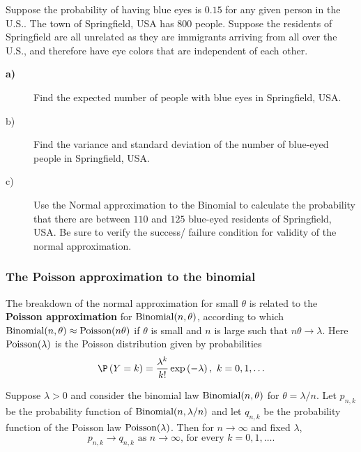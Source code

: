 \begin{Exercise}[label={ExBlueEyedInSpringfield}]
Suppose the probability of having blue eyes is $0.15$
for any given person in the U.S.. The town of Springfield, USA has $800$
people. Suppose the residents of Springfield are all unrelated as they are immigrants arriving from all over the U.S., 
and therefore have eye colors that are independent of each other.

\begin{description}
\item[\textbf{a)}] Find the expected number of people with blue eyes in
Springfield, USA.

\item[b)] Find the variance and standard deviation of the number of
blue-eyed people in Springfield, USA.

\item[c)] Use the Normal approximation to the Binomial to calculate the
probability that there are between $110$ and $125$ blue-eyed residents of
Springfield, USA. Be sure to verify the success/ failure condition for
validity of the normal approximation.
\end{description}
\end{Exercise}

\subsubsection{The Poisson approximation to the binomial}\label{S:PoissonApproxBinomialSuccessFailureRule}

The breakdown of the normal approximation for small $\theta$ is related to the 
\textbf{Poisson approximation} for $\mbox{{\rm Binomial}}(n,\theta)$, according to which $%
\binomial(n,\theta)\approx \poisson(n\theta)$ if $\theta$ is small and $n$ is large such that $%
n\theta\rightarrow \lambda $. Here $\mbox{{\rm Poisson}}(\lambda )$ is the Poisson
distribution given by probabilities 
\begin{equation*}
\P \left( Y=k\right) =\frac{\lambda ^{k}}{k!}\exp \left( -\lambda \right) ,%
\text{ }k=0,1,\ldots
\end{equation*}

\begin{prop}
Suppose $\lambda >0$ and consider the binomial law $\mbox{{\rm Binomial}}(n,\theta)$ for $\theta=\lambda
/n $. Let $p_{n,k}$ be the probability function of $\mbox{{\rm Binomial}}(n,\lambda /n)$ and let 
$q_{n,k}$ be the probability function of the Poisson law $\poisson%
(\lambda )$. Then for $n\rightarrow \infty $ and fixed $\lambda $,%
\begin{equation*}
p_{n,k}\rightarrow q_{n,k}\text{ as }n\rightarrow \infty \text{, for every }%
k=0,1,\ldots \text{.}
\end{equation*}
\end{prop}

